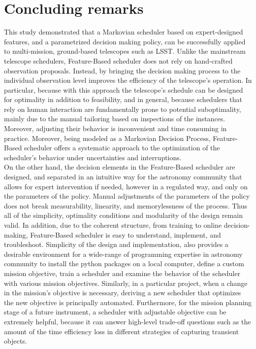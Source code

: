 \documentclass[11pt]{article}
\theoremstyle{definition}
\begin{document}
\section{Concluding remarks}\label{sec_conclusion}
This study demonstrated that a Markovian scheduler based on expert-designed features, and a parametrized decision making policy, can be successfully applied to multi-mission, ground-based telescopes such as LSST. Unlike the mainstream telescope schedulers, Feature-Based scheduler does not rely on hand-crafted observation proposals. Instead, by bringing the decision making process to the individual observation level improves the efficiency of the telescope's operation. In particular, because with this approach the telescope's schedule can be designed for optimality in addition to feasibility, and in general, because schedulers that rely on human interaction are fundamentally prone to potential suboptimality, mainly due to the manual tailoring based on inspections of the instances. Moreover, adjusting their behavior is inconvenient and time consuming in practice. Moreover, being modeled as a Markovian Decision Process, Feature-Based scheduler offers a systematic approach to the optimization of the scheduler's behavior under uncertainties and interruptions.\\
On the other hand, the decision elements in the Feature-Based scheduler are designed, and separated in an intuitive way for the astronomy community that allows for expert intervention if needed, however in a regulated way, and only on the parameters of the policy. Manual adjustments of the parameters of the policy does not break measurability, linearity, and memorylessness of the process. Thus all of the simplicity, optimality conditions and modularity of the design remain valid. In addition, due to the coherent structure, from training to online decision-making, Feature-Based scheduler is easy to understand, implement, and troubleshoot. Simplicity of the design and implementation, also provides a desirable environment for a wide-range of programming expertise in astronomy community to install the python packages on a local computer, define a custom mission objective, train a scheduler and examine the behavior of the scheduler with various mission objectives. Similarly, in a particular project, when a change in the mission's objective is necessary, deriving a new scheduler that optimizes the new objective is principally automated. Furthermore, for the mission planning stage of a future instrument, a scheduler with adjustable objective can be extremely helpful, because it can answer high-level trade-off questions such as the amount of the time efficiency loss in different strategies of capturing transient objects.\\
\end{document}
